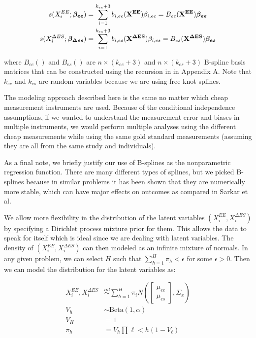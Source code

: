 \documentclass[11pt]{article}\usepackage[]{graphicx}\usepackage[]{color}
\begin{document}
\begin{align}
  s(X_i^{EE};\boldsymbol{\beta_{ee}}) &= \sum_{i=1}^{k_{ee}+3} b_{i,ee}({\bf X^{EE}}) \beta_{i,ee} = B_{ee}({\bf X^{EE}}) \boldsymbol{\beta_{ee}}\\
  s(X_i^{\Delta ES};\boldsymbol{\beta_{\Delta es}}) &= \sum_{i=1}^{k_{es}+3} b_{i,es}({\bf X^{\Delta ES}}) \beta_{i,es} = B_{es}({\bf X^{\Delta ES}}) \boldsymbol{\beta_{es}}
\end{align}

where $B_{ee}()$ and $B_{es}()$ are $n\times (k_{ee}+3)$ and $n \times (k_{es}+3)$ B-spline basis matrices that can be constructed using the recursion in \cite{nonparametric} in Appendix A. Note that $k_{ee}$ and $k_{es}$ are random variables because we are using free knot splines.

The modeling approach described here is the same no matter which cheap measurement instruments are used. Because of the conditional independence assumptions, if we wanted to understand the measurement error and biases in multiple instruments, we would perform multiple analyses using the different cheap measurements while using the same gold standard measurements (assuming they are all from the same study and individuals).

As a final note, we briefly justify our use of B-splines as the nonparametric regression function. There are many different types of splines, but we picked B-splines because in similar problems it has been shown that they are numerically more stable, which can have major effects on outcomes as compared in Sarkar et al. \cite{sarkar14} 

We allow more flexibility in the distribution of the latent variables $(X_i^{EE},X_i^{\Delta ES})$ by specifying a Dirichlet process mixture prior for them. This allows the data to speak for itself which is ideal since we are dealing with latent variables. The density of $(X_i^{EE},X_i^{\Delta ES})$ can then modeled as an infinite mixture of normals. In any given problem, we can select $H$ such that $\sum_{h=1}^{H} \pi_h < \epsilon$ for some  $\epsilon > 0$. Then we can model the distribution for the latent variables as:

\begin{align}
X_i^{EE},X_i^{\Delta ES} &\overset{iid}{\sim} \sum_{h=1}^{H} \pi_i N\left( 
  \begin{bmatrix}
  \mu_{ee} \\
  \mu_{es} 
  \end{bmatrix}
  ,
  \Sigma_x
    \right) \\
    V_h &\sim \text{Beta}(1,\alpha) \\
    V_H & = 1 \\
    \pi_h &= V_h \prod{\ell < h} (1-V_{\ell}) 
\end{align}
\end{document}
